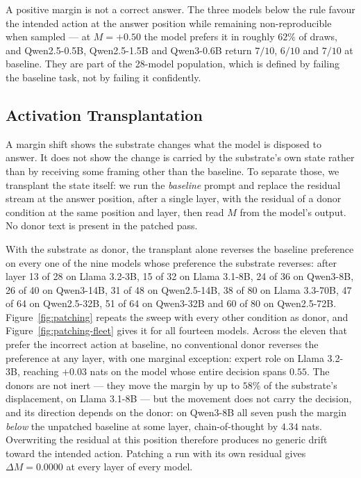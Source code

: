 A positive margin is not a correct answer. The three models below the rule
favour the intended action at the answer position while remaining
non-reproducible when sampled --- at $M=+0.50$ the model prefers it in roughly
$62\%$ of draws, and Qwen2.5-0.5B, Qwen2.5-1.5B and Qwen3-0.6B return $7/10$,
$6/10$ and $7/10$ at baseline. They are part of the 28-model population, which
is defined by failing the baseline task, not by failing it confidently.


\subsection{Activation Transplantation}
\label{sec:transplant}

A margin shift shows the substrate changes what the model is disposed to answer. It
does not show the change is carried by the substrate's own state rather than by
receiving some framing other than the baseline. To separate those, we transplant the
state itself: we run the \emph{baseline} prompt and replace the residual stream at the
answer position, after a single layer, with the residual of a donor condition at the
same position and layer, then read $M$ from the model's output. No donor text is
present in the patched pass.

With the substrate as donor, the transplant alone reverses the baseline preference on
every one of the nine models whose preference the substrate reverses: after layer 13
of 28 on Llama 3.2-3B, 15 of 32 on Llama 3.1-8B, 24 of 36 on Qwen3-8B, 26 of 40 on
Qwen3-14B, 31 of 48 on Qwen2.5-14B, 38 of 80 on Llama 3.3-70B, 47 of 64 on
Qwen2.5-32B, 51 of 64 on Qwen3-32B and 60 of 80 on Qwen2.5-72B.
Figure~\ref{fig:patching} repeats the sweep with every other condition as donor, and
Figure~\ref{fig:patching-fleet} gives it for all fourteen models. Across the eleven
that prefer the incorrect action at baseline, no conventional donor reverses the
preference at any layer, with one marginal exception: expert role on Llama 3.2-3B,
reaching $+0.03$ nats on the model whose entire decision spans $0.55$. The donors are
not inert --- they move the margin by up to $58\%$ of the substrate's displacement,
on Llama 3.1-8B --- but the movement does not carry the decision, and its direction
depends on the donor: on Qwen3-8B all seven push the margin \emph{below} the
unpatched baseline at some layer, chain-of-thought by $4.34$ nats. Overwriting the
residual at this position therefore produces no generic drift toward the intended
action. Patching a run with its own residual gives $\Delta M = 0.0000$ at every layer
of every model.

